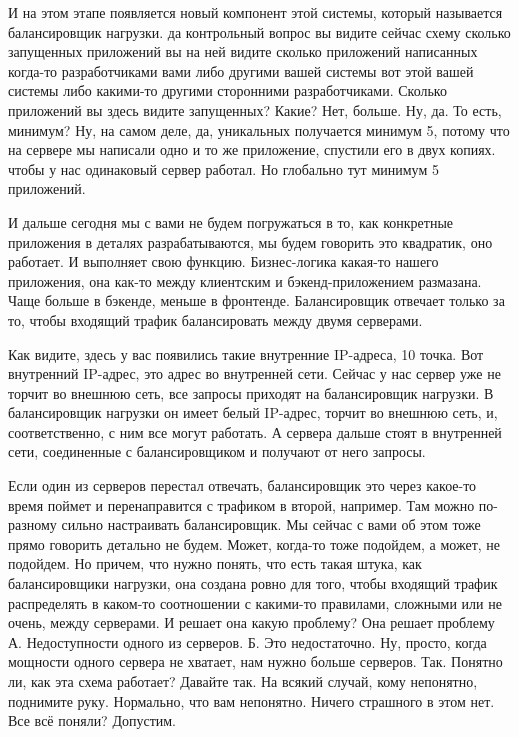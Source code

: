 \documentclass[12pt]{article} %
\begin{document}

И на этом этапе появляется новый компонент этой системы, который называется балансировщик нагрузки.  да контрольный вопрос вы видите сейчас схему сколько запущенных приложений вы на ней видите сколько приложений написанных когда-то разработчиками вами либо другими вашей системы вот этой вашей системы либо какими-то другими сторонними разработчиками. Сколько приложений вы здесь видите запущенных?  Какие?  Нет, больше. Ну, да. То есть, минимум? Ну, на самом деле, да, уникальных получается минимум 5, потому что на сервере мы написали одно и то же приложение, спустили его в двух копиях.  чтобы у нас одинаковый сервер работал.  Но глобально тут минимум 5 приложений.  

И дальше сегодня мы с вами не будем погружаться в то, как конкретные приложения в деталях разрабатываются, мы будем говорить это квадратик, оно работает.  И выполняет свою функцию.  Бизнес-логика какая-то нашего приложения, она как-то между клиентским и бэкенд-приложением размазана.  Чаще больше в бэкенде, меньше в фронтенде.  Балансировщик отвечает только за то, чтобы входящий трафик балансировать между двумя серверами.  

Как видите, здесь у вас появились такие внутренние IP-адреса, 10 точка.  Вот внутренний IP-адрес, это адрес во внутренней сети.  Сейчас у нас сервер уже не торчит во внешнюю сеть, все запросы приходят на балансировщик нагрузки.  В балансировщик нагрузки он имеет белый IP-адрес, торчит во внешнюю сеть, и, соответственно, с ним все могут работать.  А сервера дальше стоят в внутренней сети, соединенные с балансировщиком и получают от него запросы.  

Если один из серверов перестал отвечать, балансировщик это через какое-то время поймет и перенаправится с трафиком в второй, например.  Там можно по-разному сильно настраивать балансировщик. Мы сейчас с вами об этом тоже прямо говорить детально не будем.  Может, когда-то тоже подойдем, а может, не подойдем.  Но причем, что нужно понять, что есть такая штука, как балансировщики нагрузки, она создана ровно для того, чтобы входящий трафик распределять в каком-то соотношении с какими-то правилами, сложными или не очень, между серверами.  И решает она какую проблему? Она решает проблему А. Недоступности одного из серверов.  Б. Это недостаточно. Ну, просто, когда мощности одного сервера не хватает, нам нужно больше серверов.  Так. Понятно ли, как эта схема работает?  Давайте так. На всякий случай, кому непонятно, поднимите руку.  Нормально, что вам непонятно. Ничего страшного в этом нет.  Все всё поняли? Допустим.
\end{document}
